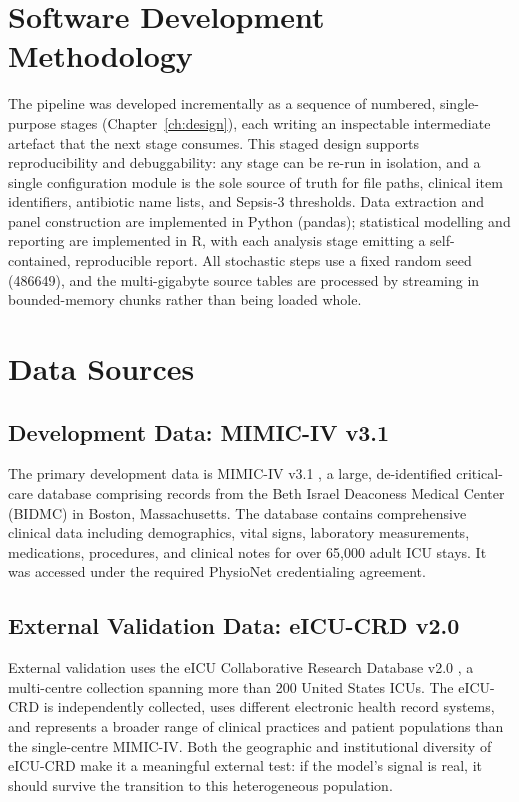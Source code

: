 \section{Software Development Methodology}
The pipeline was developed incrementally as a sequence of numbered,
single-purpose stages (Chapter~\ref{ch:design}), each writing an inspectable
intermediate artefact that the next stage consumes. This staged design supports
reproducibility and debuggability: any stage can be re-run in isolation, and a
single configuration module is the sole source of truth for file paths,
clinical item identifiers, antibiotic name lists, and Sepsis-3 thresholds.
Data extraction and panel construction are implemented in Python (pandas);
statistical modelling and reporting are implemented in R, with each analysis
stage emitting a self-contained, reproducible report. All stochastic steps use
a fixed random seed (486649), and the multi-gigabyte source tables are processed
by streaming in bounded-memory chunks rather than being loaded whole.

\section{Data Sources}
\label{sec:data}

\subsection{Development Data: MIMIC-IV v3.1}
The primary development data is MIMIC-IV v3.1 \cite{johnson2023mimiciv}, a
large, de-identified critical-care database comprising records from the Beth
Israel Deaconess Medical Center (BIDMC) in Boston, Massachusetts. The database
contains comprehensive clinical data including demographics, vital signs,
laboratory measurements, medications, procedures, and clinical notes for over
65{,}000 adult ICU stays. It was accessed under the required PhysioNet
credentialing agreement.

\subsection{External Validation Data: eICU-CRD v2.0}
External validation uses the eICU Collaborative Research Database v2.0
\cite{pollard2018eicu}, a multi-centre collection spanning more than 200
United States ICUs. The eICU-CRD is independently collected, uses different
electronic health record systems, and represents a broader range of clinical
practices and patient populations than the single-centre MIMIC-IV. Both the
geographic and institutional diversity of eICU-CRD make it a meaningful
external test: if the model's signal is real, it should survive the transition
to this heterogeneous population.

